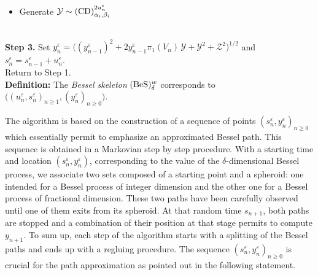 \documentclass[12pt]{article}
\numberwithin{equation}{section}
\begin{document}
\begin{framed}
\begin{minipage}{12cm}
\begin{itemize}
\item Generate $\mathcal{Y}\sim ({\rm CD})^{2u_n^\varepsilon}_{\alpha_i,\beta_i}$
\end{itemize}\end{minipage}\\[12pt]
{\bf Step 3.} Set $y_n^\varepsilon=\Big((y_{n-1}^\varepsilon)^2+2y_{n-1}^\varepsilon\pi_1(V_n)\,\mathcal{Y}+\mathcal{Y}^2+\mathcal{Z}^2\Big)^{1/2}$ and $s_n^\varepsilon=s_{n-1}^\varepsilon+u_n^\varepsilon$.\\[5pt]
\hspace*{1.5cm} Return to Step 1.\\[5pt]
\noindent
{\bf  Definition:} The \emph{Bessel skeleton} $({\rm BeS})_\delta^w$ corresponds to $\Big((u_n^\varepsilon,s_n^\varepsilon)_{n\ge 1},(y_n^\varepsilon)_{n\ge 0}\Big)$.
\end{framed}


The algorithm is based on the construction of a sequence of points $(s_n^\varepsilon,y_n^\varepsilon)_{n\ge 0}$ which essentially permit to emphasize an approximated Bessel path. This sequence is obtained in a Markovian step by step procedure. With a starting time and location $(s_n^\varepsilon,y_n^\varepsilon)$, corresponding to the value of the $\delta$-dimensional Bessel process, we associate two sets composed of a starting point and a spheroid: one intended for a Bessel process of integer dimension and the other one for a Bessel process of fractional dimension. These two paths have been carefully observed until one of them exits from its spheroid. At that random time $s_{n+1}$, both paths are stopped and a combination of their position at that stage permits to compute $y_{n+1}$. To sum up, each step of the algorithm starts with a splitting of the Bessel paths and ends up with a regluing procedure. The sequence  $(s_n^\varepsilon,y_n^\varepsilon)_{n\ge 0}$ is crucial for the path approximation as pointed out in the following statement. 
\end{document}
